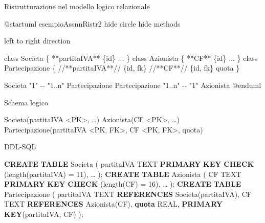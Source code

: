 \documentclass[
]{article}
\newenvironment{Shaded}{}{}
\newcommand{\DataTypeTok}[1]{\textcolor[rgb]{0.56,0.13,0.00}{#1}}
\newcommand{\DecValTok}[1]{\textcolor[rgb]{0.25,0.63,0.44}{#1}}
\newcommand{\FunctionTok}[1]{\textcolor[rgb]{0.02,0.16,0.49}{#1}}
\newcommand{\KeywordTok}[1]{\textcolor[rgb]{0.00,0.44,0.13}{\textbf{#1}}}
\newcommand{\NormalTok}[1]{#1}
\newcommand{\OperatorTok}[1]{\textcolor[rgb]{0.40,0.40,0.40}{#1}}
\begin{document}


Ristrutturazione nel modello logico relazionale

\begin{Shaded}
\begin{Highlighting}[]
\NormalTok{@startuml esempioAssnnRistr2}
\NormalTok{hide circle}
\NormalTok{hide methods}

\NormalTok{left to right direction}

\NormalTok{class Societa \{}
\NormalTok{  **partitaIVA** \{id\}}
\NormalTok{  ...}
\NormalTok{\}}
\NormalTok{class Azionista \{}
\NormalTok{  **CF** \{id\}}
\NormalTok{  ...}
\NormalTok{\}}
\NormalTok{class Partecipazione \{}
\NormalTok{  //**partitaIVA**// \{id, fk\}}
\NormalTok{  //**CF**// \{id, fk\}}
\NormalTok{  quota}
\NormalTok{\}}

\NormalTok{Societa "1" {-}{-} "1..n" Partecipazione}
\NormalTok{Partecipazione "1..n" {-}{-} "1" Azionista}
\NormalTok{@enduml}
\end{Highlighting}
\end{Shaded}



Schema logico

\begin{Shaded}
\begin{Highlighting}[]
\NormalTok{Societa(partitaIVA \textless{}PK\textgreater{}, …)}
\NormalTok{Azionista(CF \textless{}PK\textgreater{}, …)}
\NormalTok{Partecipazione(partitaIVA \textless{}PK, FK\textgreater{}, CF \textless{}PK, FK\textgreater{}, quota)}
\end{Highlighting}
\end{Shaded}

DDL-SQL

\begin{Shaded}
\begin{Highlighting}[]
\KeywordTok{CREATE} \KeywordTok{TABLE}\NormalTok{ Societa (}
\NormalTok{    partitaIVA TEXT }\KeywordTok{PRIMARY} \KeywordTok{KEY} \KeywordTok{CHECK}\NormalTok{ (}\FunctionTok{length}\NormalTok{(partitaIVA) }\OperatorTok{=} \DecValTok{11}\NormalTok{),}
\NormalTok{    …}
\NormalTok{);}
\KeywordTok{CREATE} \KeywordTok{TABLE}\NormalTok{ Azionista (}
\NormalTok{    CF TEXT }\KeywordTok{PRIMARY} \KeywordTok{KEY} \KeywordTok{CHECK}\NormalTok{ (}\FunctionTok{length}\NormalTok{(CF) }\OperatorTok{=} \DecValTok{16}\NormalTok{),}
\NormalTok{    …}
\NormalTok{);}
\KeywordTok{CREATE} \KeywordTok{TABLE}\NormalTok{ Partecipazione (}
\NormalTok{    partitaIVA TEXT }\KeywordTok{REFERENCES}\NormalTok{ Societa(partitaIVA),}
\NormalTok{    CF TEXT }\KeywordTok{REFERENCES}\NormalTok{ Azionista(CF),}
    \KeywordTok{quota} \DataTypeTok{REAL}\NormalTok{,}
    \KeywordTok{PRIMARY} \KeywordTok{KEY}\NormalTok{(partitaIVA, CF)}
\NormalTok{);}
\end{Highlighting}
\end{Shaded}
\end{document}
